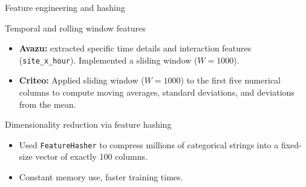\documentclass[aspectratio=169,xcolor=dvipsnames]{beamer}
\begin{document}
\begin{frame}{Feature engineering and hashing}
    \begin{block}{Temporal and rolling window features}
    \small
    \begin{itemize}
        \item \textbf{Avazu:} extracted specific time details and interaction features (\texttt{site\_x\_hour}). Implemented a sliding window ($W=1000$).
        \item \textbf{Criteo:} Applied sliding window ($W=1000$) to the first five numerical columns to compute moving averages, standard deviations, and deviations from the mean.
    \end{itemize}
    \end{block}

    \begin{block}{Dimensionality reduction via feature hashing \cite{weinberger2009feature}}
    \small
    \begin{itemize}
        \item Used \texttt{FeatureHasher} to compress millions of categorical strings into a fixed-size vector of exactly 100 columns.
        \item Constant memory use, faster training times.
    \end{itemize}
    \end{block}
\end{frame}
\end{document}
